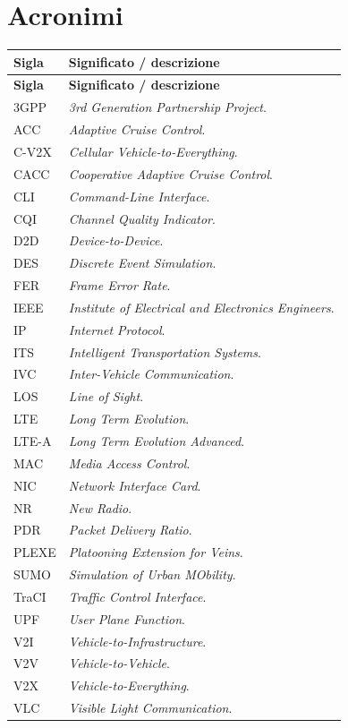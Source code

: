 \chapter*{Acronimi}
\label{ch:acronyms}

\begingroup
\small
\setlength{\LTpre}{0pt}
\setlength{\LTpost}{0pt}
\renewcommand{\arraystretch}{1.15}

\begin{longtable}{>{\raggedright\arraybackslash}p{} >{\raggedright\arraybackslash}p{}}
\textbf{Sigla} & \textbf{Significato / descrizione} \\
\hline
\endfirsthead
\textbf{Sigla} & \textbf{Significato / descrizione} \\
\hline
\endhead
3GPP & \emph{3rd Generation Partnership Project}. \\
ACC & \emph{Adaptive Cruise Control}. \\
C-V2X & \emph{Cellular Vehicle-to-Everything}. \\
CACC & \emph{Cooperative Adaptive Cruise Control}. \\
CLI & \emph{Command-Line Interface}. \\
CQI & \emph{Channel Quality Indicator}. \\
D2D & \emph{Device-to-Device}. \\
DES & \emph{Discrete Event Simulation}. \\
FER & \emph{Frame Error Rate}. \\
IEEE & \emph{Institute of Electrical and Electronics Engineers}. \\
IP & \emph{Internet Protocol}. \\
ITS & \emph{Intelligent Transportation Systems}. \\
IVC & \emph{Inter-Vehicle Communication}. \\
LOS & \emph{Line of Sight}. \\
LTE & \emph{Long Term Evolution}. \\
LTE-A & \emph{Long Term Evolution Advanced}. \\
MAC & \emph{Media Access Control}. \\
NIC & \emph{Network Interface Card}. \\
NR & \emph{New Radio}. \\
PDR & \emph{Packet Delivery Ratio}. \\
PLEXE & \emph{Platooning Extension for Veins}. \\
SUMO & \emph{Simulation of Urban MObility}. \\
TraCI & \emph{Traffic Control Interface}. \\
UPF & \emph{User Plane Function}. \\
V2I & \emph{Vehicle-to-Infrastructure}. \\
V2V & \emph{Vehicle-to-Vehicle}. \\
V2X & \emph{Vehicle-to-Everything}. \\
VLC & \emph{Visible Light Communication}. \\
\end{longtable}
\endgroup
